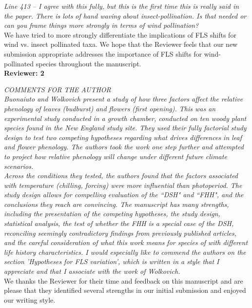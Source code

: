 \documentclass[11pt]{article}
\begin{document}
\emph{Line 413 – I agree with this fully, but this is the first time this is really said in the paper. There is lots of hand waving about insect-pollination. Is that needed or can you frame things more strongly in terms of wind pollination?}\\

We have tried to more strongly differentiate the implications of FLS shifts for wind vs. insect pollinated taxa. We hope that the Reviewer feels that our new submission appropriate addresses the importance of FLS shifts for wind-pollinated species throughout the manuscript.\\

\textbf{Reviewer: 2}

\emph{COMMENTS FOR THE AUTHOR}\\
\emph{Buonaiuto and Wolkovich present a study of how three factors affect the relative phenology of leaves (budburst) and flowers (first opening).  This was an experimental study conducted in a growth chamber, conducted on ten woody plant species found in the New England study site. They used their fully factorial study design to test two competing hypotheses regarding what drives differences in leaf and flower phenology. The authors took the work one step further and attempted to project how relative phenology will change under different future climate scenarios.}\\

\emph{Across the conditions they tested, the authors found that the factors associated with temperature (chilling, forcing) were more influential than photoperiod. The study design allows for compelling evaluation of the ``DSH" and ``FHH", and the conclusions they reach are convincing. The manuscript has many strengths, including the presentation of the competing hypotheses, the study design, statistical analysis, the test of whether the FHH is a special case of the DSH, reconciling seemingly contradictory findings from previously published articles, and the careful consideration of what this work means for species of with different life history characteristics. I would especially like to commend the authors on the section 'Hypotheses for FLS variation', which is written in a style that I appreciate and that I associate with the work of Wolkovich.}\\

We thanks the Reviewer for their time and feedback on this manuscript and are please that they identified several strengths in our initial submission and enjoyed our writing style.\\
\end{document}
